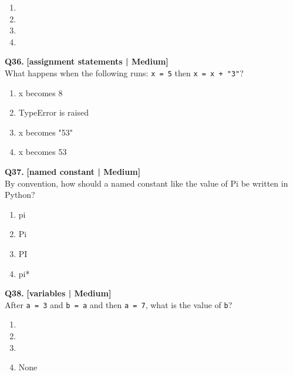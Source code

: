 \begin{enumerate}[label=(\alph*),topsep=2pt,itemsep=1pt,partopsep=0pt,parsep=0pt]
    \item {}
    \item {}
    \item {}
    \item {}
\end{enumerate}
\vspace{2mm}

\noindent\textbf{Q36.} \hfill {\small\color{LPUOrange}\textbf{[assignment statements | Medium]}}\\[2pt]
What happens when the following runs: \texttt{x = 5} then \texttt{x = x + "3"}?

\begin{enumerate}[label=(\alph*),topsep=2pt,itemsep=1pt,partopsep=0pt,parsep=0pt]
    \item \relax x becomes 8
    \item \relax TypeError is raised
    \item \relax x becomes "53"
    \item \relax x becomes 53
\end{enumerate}
\vspace{2mm}

\noindent\textbf{Q37.} \hfill {\small\color{LPUOrange}\textbf{[named constant | Medium]}}\\[2pt]
By convention, how should a named constant like the value of Pi be written in Python?

\begin{enumerate}[label=(\alph*),topsep=2pt,itemsep=1pt,partopsep=0pt,parsep=0pt]
    \item \relax pi
    \item \relax Pi
    \item \relax PI
    \item \relax *pi*
\end{enumerate}
\vspace{2mm}

\noindent\textbf{Q38.} \hfill {\small\color{LPUOrange}\textbf{[variables | Medium]}}\\[2pt]
After \texttt{a = 3} and \texttt{b = a} and then \texttt{a = 7}, what is the value of \texttt{b}?

\begin{enumerate}[label=(\alph*),topsep=2pt,itemsep=1pt,partopsep=0pt,parsep=0pt]
    \item {}
    \item {}
    \item {}
    \item \relax None
\end{enumerate}
\vspace{2mm}

